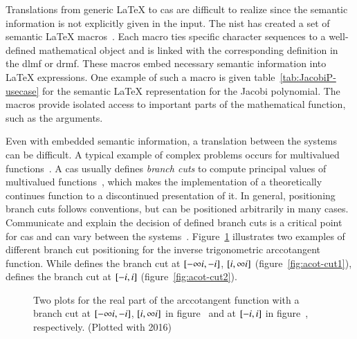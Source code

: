 Translations from generic \LaTeX{} to \gls*{cas} are difficult to realize since the semantic information is not explicitly given in the input. The \gls*{nist} has created a set of semantic \LaTeX{} macros~\cite{DLMF:Macros}. Each macro ties specific character sequences to a well-defined mathematical object and is linked with the corresponding definition in the \gls*{dlmf} or \gls*{drmf}. These macros embed necessary semantic information into \LaTeX{} expressions. One example of such a macro is given table~\ref{tab:JacobiP-usecase} for the semantic \LaTeX{} representation for the Jacobi polynomial. The macros provide isolated access to important parts of the mathematical function, such as the arguments. 

Even with embedded semantic information, a translation between the systems can be difficult. A typical example of complex problems occurs for multivalued functions~\parencite{AISC:MultivaluedFunctions}. A \gls*{cas} usually defines \textit{branch cuts} to compute principal values of multivalued functions~\parencite{Maple:Cuts}, which makes the implementation of a theoretically continues function to a discontinued presentation of it. In general, positioning branch cuts follows conventions, but can be positioned arbitrarily in many cases. Communicate and explain the decision of defined branch cuts is a critical point for \gls*{cas} and can vary between the systems~\parencite{Branches:acot}. Figure~\ref{fig:acot-cut-compare} illustrates two examples of different branch cut positioning for the inverse trigonometric arccotangent function. While \Maple{} defines the branch cut at ${[-\infty{i}, -{i}]}$, ${[{i},\infty{i}]}$ (figure~\ref{fig:acot-cut1}), \Mathematica{} defines the branch cut at ${[-{i}, {i}]}$ (figure~\ref{fig:acot-cut2}).

\begin{figure}[ht]
    \centering
    \hspace{0.5cm}
    \caption{Two plots for the real part of the arccotangent function with a branch cut at $[-\infty{i}, -{i}]$, $[{i},\infty{i}]$ in figure~\protect{} and at $[-{i}, {i}]$ in figure~\protect{}, respectively. (Plotted with \Maple{} 2016)}
    \label{fig:acot-cut-compare}
\end{figure}


